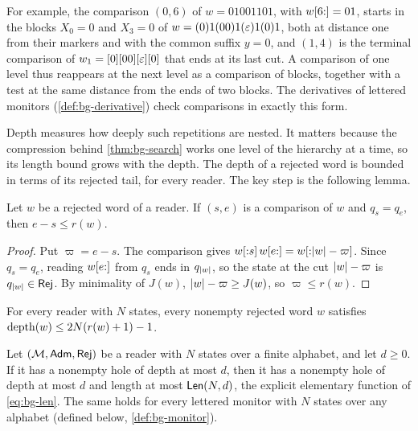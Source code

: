 For example, the comparison $(0,6)$ of $w=01001101$, with $w[6{:}]=01$,
starts in the blocks $X_0=0$ and $X_3=0$ of $w=(0)1(00)1(\varepsilon)1(0)1$, both at
distance one from their markers and with the common suffix $y=0$, and $(1,4)$ is
the terminal comparison of $w_1=[0][00][\varepsilon][0]$ that ends at its last cut. A
comparison of one level thus reappears at the next level as a comparison of
blocks, together with a test at the same distance from the ends of two blocks.
The derivatives of lettered monitors (\cref{def:bg-derivative}) check
comparisons in exactly this form.

Depth measures how deeply such repetitions are nested. It matters because the
compression behind \cref{thm:bg-search} works one level of the hierarchy at a
time, so its length bound grows with the depth. The depth of a rejected word is
bounded in terms of its rejected tail, for every reader. The key step is the
following lemma.

\begin{lemma}\label{lem:bg-return-gap}
Let $w$ be a rejected word of a reader. If $(s,e)$ is a comparison of $w$ and
$q_s=q_e$, then $e-s\le r(w)$.
\end{lemma}
\begin{proof}
Put $\varpi=e-s$. The comparison gives $w[{:}s]\,w[e{:}]=w[{:}\lvert w\rvert-\varpi]$. Since $q_s=q_e$, reading $w[e{:}]$ from $q_s$ ends in $q_{\lvert w\rvert}$,
so the state at the cut $\lvert w\rvert-\varpi$ is $q_{\lvert w\rvert}\in\mathsf{Rej}$. By minimality of
$J(w)$, $\lvert w\rvert-\varpi\ge J(w)$, so $\varpi\le r(w)$.
\end{proof}

\begin{theorem}\label{thm:bg-depth}
For every reader with $N$ states, every nonempty rejected word $w$
satisfies $\operatorname{depth}(w)\le2N(r(w)+1)-1$.
\end{theorem}

\begin{theorem}\label{thm:bg-search}
Let $(\mathcal M,\mathsf{Adm},\mathsf{Rej})$ be a reader with $N$ states over a finite alphabet,
and let $d\ge0$. If it has a nonempty hole of depth at most $d$, then it has a
nonempty hole of depth at most $d$ and length at most $\mathsf{Len}(N,d)$, the
explicit elementary function of \cref{eq:bg-len}. The same holds for every
lettered monitor with $N$ states over any alphabet (defined below,
\cref{def:bg-monitor}).
\end{theorem}

